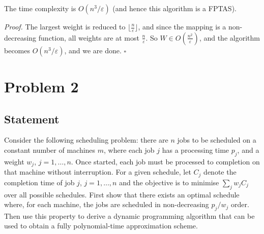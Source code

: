 \documentclass[a4paper]{article}
\newenvironment{proof}{\begin{breakbox}\textit{Proof.}}{\hfill$\square$\end{breakbox}}
\newcommand{\eps}{\varepsilon}
\begin{document}
\begin{claim}
    The time complexity is $O(n^3 / \eps)$ (and hence this algorithm is a FPTAS).
\end{claim}
\begin{proof}
    The largest weight is reduced to $\lfloor\frac{n}{\eps}\rfloor$, and since the mapping is a non-decreasing function, all weights are at most $\frac{n}{\eps}$. So $W \in O(\frac{n^2}{\eps})$,
    and the algorithm becomes $O(n^3 / \eps)$, and we are done.
\end{proof}

\newpage

\section{Problem 2}
\subsection{Statement}
Consider the following scheduling problem: there are $n$ jobs to be scheduled on a constant number of machines $m$, where each job $j$ has a processing time $p_j$, and a weight $w_j$, $j = 1, \ldots, n$.
Once started, each job must be processed to completion on that machine without interruption. For a given schedule, let $C_j$ denote the completion time of job $j$, $j = 1, \ldots, n$ and the
objective is to minimise $\sum_j w_j C_j$ over all possible schedules. First show that there exists an optimal schedule where, for each machine, the jobs are scheduled in non-decreasing
$p_j/w_j$ order. Then use this property to derive a dynamic programming algorithm that can be used to obtain a fully polynomial-time approximation scheme.
\end{document}
